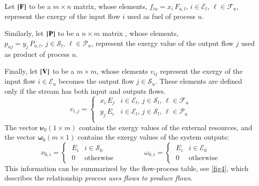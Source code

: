 \documentclass{ecos2018}
\begin{document}
Let  $\left[ \textbf{F} \right]$ to be a  $m \times n$ matrix, whose elements, $f_{iu}=x_i\,F_{u,l},\, i\in\mathcal{E}_l, \, \ell\in\mathcal{F}_u$, represent the exergy  of the input flow $i$ used as fuel of process $u$.

Similarly, let $\left[ \textbf{P} \right]$ to be a $n \times m$ matrix , whose elements, $p_{uj}=y_j\,P_{u,l},\, j\in\mathcal{S}_l, \, \ell\in\mathcal{P}_u$, represent the exergy value of the output flow $j$ used as product of process $u$.
 
Finally, let $\left[ \textbf{V} \right]$ to be a $m \times m$, whose elements $v_{ij}$ represent the exergy of the input flow $i\in\mathcal{E}_u$ becomes the output flow $j\in\mathcal{S}_u$. These elements are defined only if the stream has both input and outputs flows.
\begin{equation}
v_{i,j}=\begin{cases}
\;x_i\,E_j & i\in\mathcal{E}_l,\, j\in\mathcal{S}_l,\, \ell\in\mathcal{F}_u\\[1em]
\;y_j\,E_i & i\in\mathcal{E}_l,\, j\in\mathcal{S}_l,\, \ell\in\mathcal{P}_u\\
\end{cases}
\end{equation}
The vector $\bm{\nu}_0 (1 \times m)$ contains the exergy values of the external resources, and the vector $\bm{\omega}_0 (m \times 1)$ contains the exergy values of the system outputs:
\begin{equation}
\nu_{0,i}=\begin{cases}
\;E_i & i\in\mathcal{S}_0 \\
\;0   & \text{otherwise}
\end{cases}
\qquad\qquad
\omega_{0,i}=\begin{cases}
\;E_i & i\in\mathcal{E}_0 \\
\;0   & \text{otherwise}
\end{cases}
\end{equation}
This information can be summarized by the flow-process table, see \cref{fig4}, which describes the relationship \emph{process uses flows to produce flows}.
\end{document}
